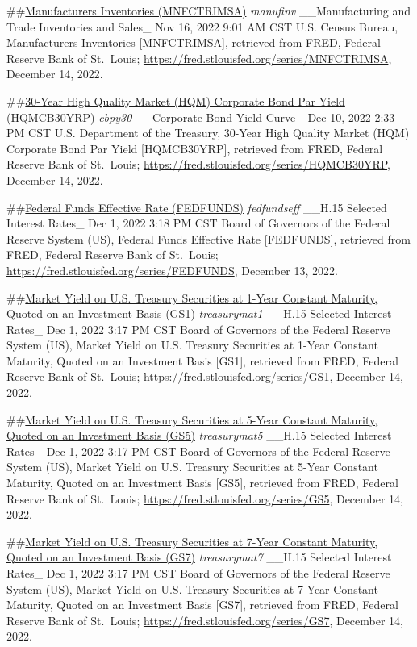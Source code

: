\documentclass[
]{article}
\begin{document}
\#\#\href{https://fred.stlouisfed.org/series/MNFCTRIMSA}{Manufacturers
Inventories (MNFCTRIMSA)} \emph{manufinv} \_\_Manufacturing and Trade
Inventories and Sales\_ Nov 16, 2022 9:01 AM CST U.S. Census Bureau,
Manufacturers Inventories {[}MNFCTRIMSA{]}, retrieved from FRED, Federal
Reserve Bank of St.~Louis;
\url{https://fred.stlouisfed.org/series/MNFCTRIMSA}, December 14, 2022.

\#\#\href{https://fred.stlouisfed.org/series/HQMCB30YRP}{30-Year High
Quality Market (HQM) Corporate Bond Par Yield (HQMCB30YRP)}
\emph{cbpy30} \_\_Corporate Bond Yield Curve\_ Dec 10, 2022 2:33 PM CST
U.S. Department of the Treasury, 30-Year High Quality Market (HQM)
Corporate Bond Par Yield {[}HQMCB30YRP{]}, retrieved from FRED, Federal
Reserve Bank of St.~Louis;
\url{https://fred.stlouisfed.org/series/HQMCB30YRP}, December 14, 2022.

\#\#\href{https://fred.stlouisfed.org/series/FEDFUNDS}{Federal Funds
Effective Rate (FEDFUNDS)} \emph{fedfundseff} \_\_H.15 Selected Interest
Rates\_ Dec 1, 2022 3:18 PM CST Board of Governors of the Federal
Reserve System (US), Federal Funds Effective Rate {[}FEDFUNDS{]},
retrieved from FRED, Federal Reserve Bank of St.~Louis;
\url{https://fred.stlouisfed.org/series/FEDFUNDS}, December 13, 2022.

\#\#\href{https://fred.stlouisfed.org/series/GS1}{Market Yield on U.S.
Treasury Securities at 1-Year Constant Maturity, Quoted on an Investment
Basis (GS1)} \emph{treasurymat1} \_\_H.15 Selected Interest Rates\_ Dec
1, 2022 3:17 PM CST Board of Governors of the Federal Reserve System
(US), Market Yield on U.S. Treasury Securities at 1-Year Constant
Maturity, Quoted on an Investment Basis {[}GS1{]}, retrieved from FRED,
Federal Reserve Bank of St.~Louis;
\url{https://fred.stlouisfed.org/series/GS1}, December 14, 2022.

\#\#\href{https://fred.stlouisfed.org/series/GS5}{Market Yield on U.S.
Treasury Securities at 5-Year Constant Maturity, Quoted on an Investment
Basis (GS5)} \emph{treasurymat5} \_\_H.15 Selected Interest Rates\_ Dec
1, 2022 3:17 PM CST Board of Governors of the Federal Reserve System
(US), Market Yield on U.S. Treasury Securities at 5-Year Constant
Maturity, Quoted on an Investment Basis {[}GS5{]}, retrieved from FRED,
Federal Reserve Bank of St.~Louis;
\url{https://fred.stlouisfed.org/series/GS5}, December 14, 2022.

\#\#\href{https://fred.stlouisfed.org/series/GS7}{Market Yield on U.S.
Treasury Securities at 7-Year Constant Maturity, Quoted on an Investment
Basis (GS7)} \emph{treasurymat7} \_\_H.15 Selected Interest Rates\_ Dec
1, 2022 3:17 PM CST Board of Governors of the Federal Reserve System
(US), Market Yield on U.S. Treasury Securities at 7-Year Constant
Maturity, Quoted on an Investment Basis {[}GS7{]}, retrieved from FRED,
Federal Reserve Bank of St.~Louis;
\url{https://fred.stlouisfed.org/series/GS7}, December 14, 2022.
\end{document}
